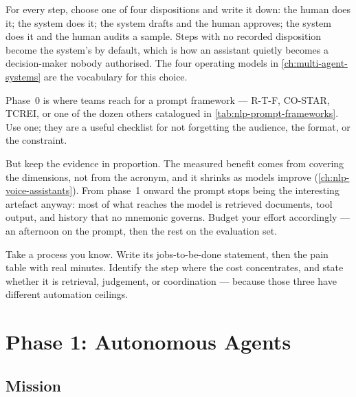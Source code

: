 \begin{cautionbox}
For every step, choose one of four dispositions and write it down: the human
does it; the system does it; the system drafts and the human approves; the
system does it and the human audits a sample. Steps with no recorded
disposition become the system's by default, which is how an assistant quietly
becomes a decision-maker nobody authorised. The four operating models in
\cref{ch:multi-agent-systems} are the vocabulary for this choice.
\end{cautionbox}

\begin{engineernote}
Phase~0 is where teams reach for a prompt framework --- R-T-F, CO-STAR, TCREI,
or one of the dozen others catalogued in
\cref{tab:nlp-prompt-frameworks}. Use one; they are a useful checklist for not
forgetting the audience, the format, or the constraint.

But keep the evidence in proportion. The measured benefit comes from covering
the dimensions, not from the acronym, and it shrinks as models improve
(\cref{ch:nlp-voice-assistants}). From phase~1 onward the prompt stops being
the interesting artefact anyway: most of what reaches the model is retrieved
documents, tool output, and history that no mnemonic governs. Budget your
effort accordingly --- an afternoon on the prompt, then the rest on the
evaluation set.
\end{engineernote}

\begin{checkpoint}
Take a process you know. Write its jobs-to-be-done statement, then the pain
table with real minutes. Identify the step where the cost concentrates, and
state whether it is retrieval, judgement, or coordination --- because those
three have different automation ceilings.
\end{checkpoint}

\section{Phase 1: Autonomous Agents}

\subsection{Mission}

